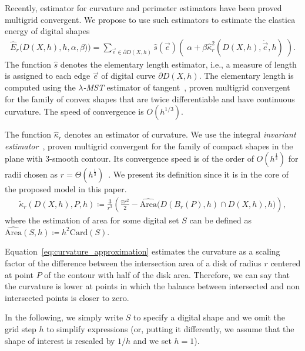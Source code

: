 \documentclass[smallextended]{svjour3}
\begin{document}
Recently, estimator for curvature and perimeter estimators have been proved multigrid convergent. We propose to use such estimators to estimate the elastica energy of digital shapes
%
%
\begin{align}
	\hat{E}_r\big( D(X,h),h,\alpha,\beta) \big) = \sum_{\vec{e} \in \partial D(X,h)}{ \hat{s}(\vec{e})\left(\; \alpha + \beta \hat{\kappa}_{r}^2(D(X,h),\dot{\vec{e}},h) \; \right)}.
	\label{eq:digital-energy}
\end{align}
%
%
The function $\hat{s}$ denotes the elementary length estimator, i.e., a measure of length is assigned to each edge $\vec{e}$ of digital curve $\partial D(X,h)$. The elementary length is computed using the \emph{$\lambda$-MST} estimator of tangent~\cite{lachaud07tangent,lachaud06hdr}, proven multigrid convergent for the family of convex shapes that are twice differentiable and have continuous curvature. The speed of convergence is $O(h^{1/3})$.

The function $\hat{\kappa} _r$ denotes an estimator of curvature. We use the integral \emph{invariant estimator}~\cite{coeurjolly13integral}, proven multigrid convergent for the family of compact shapes in the plane with $3$-smooth contour. Its convergence speed is of the order of $O(h^{\frac{1}{3}})$ for radii chosen as $r=\Theta (h^{\frac{1}{3}})$~\cite{lachaud2017robust}. We present its definition since it is in the core of the proposed model in this paper.
%
%
\begin{align}
  \tilde{\kappa}_r(D(X,h),P,h) \coloneqq \frac{3}{r^3}\left( \frac{\pi r^2}{2} - \widehat{\text{Area}}\big( D(B_r(P),h) \cap D(X,h),h\big) \right),
  \label{eq:curvature_approximation}
\end{align}
%
%
where the estimation of area for some digital set $S$ can be defined as $\widehat{\text{Area}}(S,h) \coloneqq h^2\text{Card}\left( S \right).$ 

Equation~\ref{eq:curvature_approximation} estimates the curvature as a scaling factor of the difference between the intersection area of a disk of radius $r$ centered at point $P$ of the contour with half of the disk area. Therefore, we can say that the curvature is lower at points in which the balance between intersected and non intersected points is closer to zero.

In the following, we simply write $S$ to specify a digital shape and we omit the grid step $h$ to simplify expressions (or, putting it differently, we assume that the shape of interest is rescaled by $1/h$ and we set $h = 1$).
\end{document}
